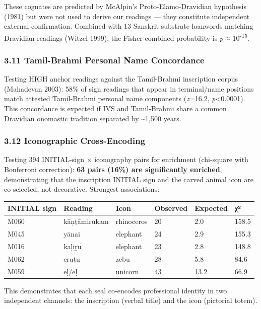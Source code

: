 \documentclass[
  11pt,
]{article}
\newcounter{none} %
\begin{document}
These cognates are predicted by McAlpin's Proto-Elamo-Dravidian
hypothesis (1981) but were not used to derive our readings --- they
constitute independent external confirmation. Combined with 13 Sanskrit
substrate loanwords matching Dravidian readings (Witzel 1999), the
Fisher combined probability is \emph{p}$\approx$10\textsuperscript{-15}.

\subsubsection{3.11 Tamil-Brahmi Personal Name
Concordance}\label{tamil-brahmi-personal-name-concordance}

Testing HIGH anchor readings against the Tamil-Brahmi inscription corpus
(Mahadevan 2003): 58\% of sign readings that appear in terminal/name
positions match attested Tamil-Brahmi personal name components
(\emph{z}=16.2, \emph{p}\textless0.0001). This concordance is expected
if IVS and Tamil-Brahmi share a common Dravidian onomastic tradition
separated by \textasciitilde1,500 years.

\subsubsection{3.12 Iconographic
Cross-Encoding}\label{iconographic-cross-encoding}

Testing 394 INITIAL-sign × iconography pairs for enrichment (chi-square
with Bonferroni correction): \textbf{63 pairs (16\%) are significantly
enriched}, demonstrating that the inscription INITIAL sign and the
carved animal icon are co-selected, not decorative. Strongest
associations:

{\def\LTcaptype{none} %
\begin{longtable}[]{@{}llllll@{}}
\toprule\noalign{}
INITIAL sign & Reading & Icon & Observed & Expected & χ² \\
\midrule\noalign{}
\endhead
\bottomrule\noalign{}
\endlastfoot
M060 & kāṇṭāmirukam & rhinoceros & 20 & 2.0 & 158.5 \\
M045 & yānai & elephant & 24 & 2.9 & 155.3 \\
M016 & kaḷiṟu & elephant & 23 & 2.8 & 148.8 \\
M062 & erutu & zebu & 28 & 5.8 & 84.6 \\
M059 & ēḷ/eḷ & unicorn & 43 & 13.2 & 66.9 \\
\end{longtable}
}

This demonstrates that each seal co-encodes professional identity in two
independent channels: the inscription (verbal title) and the icon
(pictorial totem).
\end{document}
